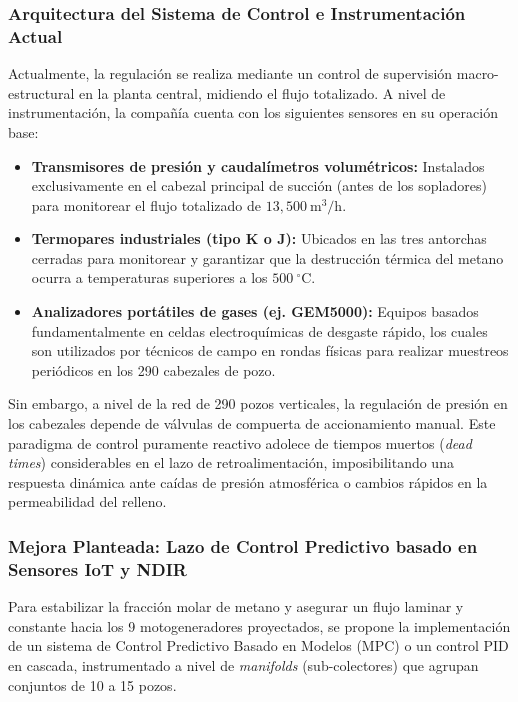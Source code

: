 \documentclass[11pt,letterpaper]{article}
\begin{document}
\subsubsection{Arquitectura del Sistema de Control e Instrumentación Actual}

Actualmente, la regulación se realiza mediante un control de supervisión
macro-estructural en la planta central, midiendo el flujo totalizado. A nivel de
instrumentación, la compañía cuenta con los siguientes sensores en su operación
base:
\begin{itemize}
  \item \textbf{Transmisores de presión y caudalímetros volumétricos:}
    Instalados exclusivamente en el cabezal principal de succión (antes de los
    sopladores) para monitorear el flujo totalizado de
    $13,500~\text{m}^3/\text{h}$.
  \item \textbf{Termopares industriales (tipo K o J):} Ubicados en las tres
    antorchas cerradas para monitorear y garantizar que la destrucción térmica
    del metano ocurra a temperaturas superiores a los $500~^{\circ}\text{C}$.
  \item \textbf{Analizadores portátiles de gases (ej.  GEM5000):} Equipos
    basados fundamentalmente en celdas electroquímicas de desgaste rápido, los
    cuales son utilizados por técnicos de campo en rondas físicas para realizar
    muestreos periódicos en los 290 cabezales de pozo.
\end{itemize}

Sin embargo, a nivel de la red de 290 pozos verticales, la regulación de presión
en los cabezales depende de válvulas de compuerta de accionamiento manual. Este
paradigma de control puramente reactivo adolece de tiempos muertos (\textit{dead
times}) considerables en el lazo de retroalimentación, imposibilitando una
respuesta dinámica ante caídas de presión atmosférica o cambios rápidos en la
permeabilidad del relleno.

\subsubsection{Mejora Planteada: Lazo de Control Predictivo basado en Sensores
IoT y NDIR}

Para estabilizar la fracción molar de metano y asegurar un flujo laminar y
constante hacia los 9 motogeneradores proyectados, se propone la implementación
de un sistema de Control Predictivo Basado en Modelos (MPC) o un control PID en
cascada, instrumentado a nivel de \textit{manifolds} (sub-colectores) que
agrupan conjuntos de 10 a 15 pozos.
\end{document}
